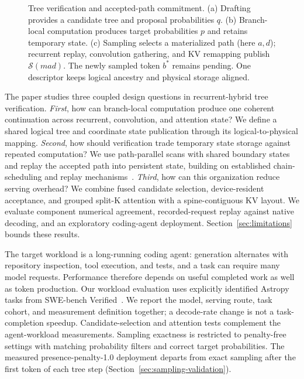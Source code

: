 \documentclass[conference]{IEEEtran}
\begin{document}
\begin{figure}[t]
\centering
\resizebox{\textwidth}{!}{}
\caption{Tree verification and accepted-path commitment. (a) Drafting provides a candidate tree and proposal probabilities $q$. (b) Branch-local computation produces target probabilities $p$ and retains temporary state. (c) Sampling selects a materialized path (here $a,d$); recurrent replay, convolution gathering, and KV remapping publish $\mathcal{S}(mad)$. The newly sampled token $b^*$ remains pending. One descriptor keeps logical ancestry and physical storage aligned.}
\label{fig:pipeline}
\end{figure}

The paper studies three coupled design questions in recurrent-hybrid tree verification. \textit{First}, how can branch-local computation produce one coherent continuation across recurrent, convolution, and attention state? We define a shared logical tree and coordinate state publication through its logical-to-physical mapping. \textit{Second}, how should verification trade temporary state storage against repeated computation? We use path-parallel scans with shared boundary states and replay the accepted path into persistent state, building on established chain-scheduling and replay mechanisms~\cite{wang2026specla,oda2026marginals}. \textit{Third}, how can this organization reduce serving overhead? We combine fused candidate selection, device-resident acceptance, and grouped split-K attention with a spine-contiguous KV layout. We evaluate component numerical agreement, recorded-request replay against native decoding, and an exploratory coding-agent deployment. Section~\ref{sec:limitations} bounds these results.

The target workload is a long-running coding agent: generation alternates with repository inspection, tool execution, and tests, and a task can require many model requests. Performance therefore depends on useful completed work as well as token production. Our workload evaluation uses explicitly identified Astropy tasks from SWE-bench Verified~\cite{jimenez2024swe}. We report the model, serving route, task cohort, and measurement definition together; a decode-rate change is not a task-completion speedup. Candidate-selection and attention tests complement the agent-workload measurements. Sampling exactness is restricted to penalty-free settings with matching probability filters and correct target probabilities. The measured presence-penalty-1.0 deployment departs from exact sampling after the first token of each tree step (Section~\ref{sec:sampling-validation}).
\end{document}
